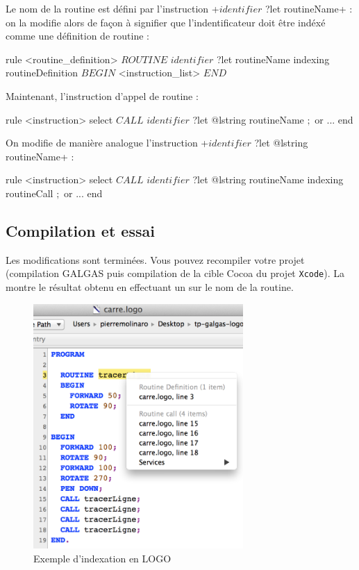 Le nom de la routine est défini par l'instruction \ggs+$identifier$ ?let routineName+ : on la modifie alors de façon à signifier que l'indentificateur doit être indéxé comme une définition de routine :

\begin{galgas}
rule <routine_definition> {
  $ROUTINE$
  $identifier$ ?let routineName indexing routineDefinition
  $BEGIN$
  <instruction_list>
  $END$
}
\end{galgas}

Maintenant, l'instruction d'appel de routine :

\begin{galgas}
rule <instruction> {
  select
    $CALL$
    $identifier$ ?let @lstring routineName
    $;$
  or
    ...
  end
}
\end{galgas}

On modifie de manière analogue l'instruction \ggs+$identifier$ ?let @lstring routineName+ :

\begin{galgas}
rule <instruction> {
  select
    $CALL$
    $identifier$ ?let @lstring routineName indexing routineCall
    $;$
  or
    ...
  end
}
\end{galgas}



\subsection{Compilation et essai}

Les modifications sont terminées. Vous pouvez recompiler votre projet (compilation GALGAS puis compilation de la cible Cocoa du projet \texttt{Xcode}). La  montre le résultat obtenu en effectuant un  sur le nom de la routine.

\begin{figure}[t]
  \centering
  \includegraphics[width=8cm]{chapter-cocoa-features/exemple-indexation-logo.png}
  \caption{Exemple d'indexation en LOGO}
  \ligne
\end{figure}



